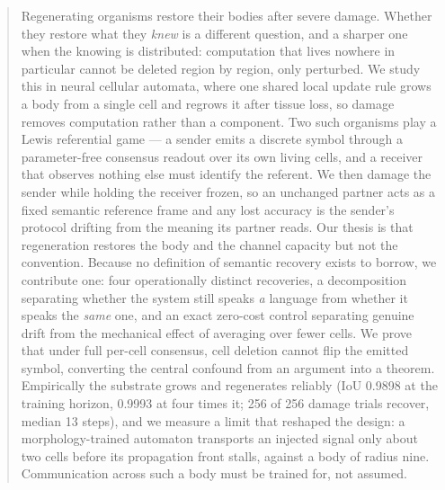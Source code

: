 \begin{abstract}
Regenerating organisms restore their bodies after severe damage. Whether they
restore what they \emph{knew} is a different question, and a sharper one when the
knowing is distributed: computation that lives nowhere in particular cannot be
deleted region by region, only perturbed. We study this in neural cellular
automata, where one shared local update rule grows a body from a single cell and
regrows it after tissue loss, so damage removes computation rather than a
component. Two such organisms play a Lewis referential game --- a sender emits a
discrete symbol through a parameter-free consensus readout over its own living
cells, and a receiver that observes nothing else must identify the referent. We
then damage the sender while holding the receiver frozen, so an unchanged partner
acts as a fixed semantic reference frame and any lost accuracy is the sender's
protocol drifting from the meaning its partner reads. Our thesis is that
regeneration restores the body and the channel capacity but not the convention.
%
Because no definition of semantic recovery exists to borrow, we contribute one:
four operationally distinct recoveries, a decomposition separating whether the
system still speaks \emph{a} language from whether it speaks the \emph{same} one,
and an exact zero-cost control separating genuine drift from the mechanical
effect of averaging over fewer cells. We prove that under full per-cell
consensus, cell deletion cannot flip the emitted symbol, converting the central
confound from an argument into a theorem. Empirically the substrate grows and
regenerates reliably (IoU 0.9898 at the training horizon, 0.9993 at four times
it; 256 of 256 damage trials recover, median 13 steps), and we measure a limit
that reshaped the design: a morphology-trained automaton transports an injected
signal only about two cells before its propagation front stalls, against a body
of radius nine. Communication across such a body must be trained for, not
assumed. 
\end{abstract}
